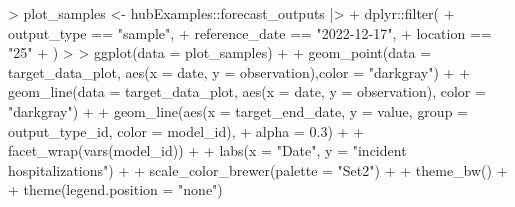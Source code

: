 \documentclass[
]{article}
\newenvironment{Shaded}{\begin{snugshade}}{\end{snugshade}}
\newcommand{\AttributeTok}[1]{\textcolor[rgb]{0.40,0.45,0.13}{#1}}
\newcommand{\ErrorTok}[1]{\textcolor[rgb]{0.68,0.00,0.00}{#1}}
\newcommand{\FloatTok}[1]{\textcolor[rgb]{0.68,0.00,0.00}{#1}}
\newcommand{\FunctionTok}[1]{\textcolor[rgb]{0.28,0.35,0.67}{#1}}
\newcommand{\NormalTok}[1]{\textcolor[rgb]{0.00,0.23,0.31}{#1}}
\newcommand{\OtherTok}[1]{\textcolor[rgb]{0.00,0.23,0.31}{#1}}
\newcommand{\SpecialCharTok}[1]{\textcolor[rgb]{0.37,0.37,0.37}{#1}}
\newcommand{\StringTok}[1]{\textcolor[rgb]{0.13,0.47,0.30}{#1}}
\begin{document}
\begin{Shaded}
\begin{Highlighting}[]
\SpecialCharTok{\textgreater{}}\NormalTok{ plot\_samples }\OtherTok{\textless{}{-}}\NormalTok{ hubExamples}\SpecialCharTok{::}\NormalTok{forecast\_outputs }\SpecialCharTok{|\textgreater{}}
\SpecialCharTok{+}\NormalTok{   dplyr}\SpecialCharTok{::}\FunctionTok{filter}\NormalTok{(}
\SpecialCharTok{+}\NormalTok{     output\_type }\SpecialCharTok{==} \StringTok{"sample"}\NormalTok{, }
\SpecialCharTok{+}\NormalTok{     reference\_date }\SpecialCharTok{==} \StringTok{"2022{-}12{-}17"}\NormalTok{,}
\SpecialCharTok{+}\NormalTok{     location }\SpecialCharTok{==} \StringTok{"25"}
\SpecialCharTok{+}\NormalTok{   )}
\SpecialCharTok{\textgreater{}}   
\ErrorTok{\textgreater{}} \FunctionTok{ggplot}\NormalTok{(}\AttributeTok{data =}\NormalTok{ plot\_samples) }\SpecialCharTok{+} 
\SpecialCharTok{+}   \FunctionTok{geom\_point}\NormalTok{(}\AttributeTok{data =}\NormalTok{ target\_data\_plot, }\FunctionTok{aes}\NormalTok{(}\AttributeTok{x =}\NormalTok{ date, }\AttributeTok{y =}\NormalTok{ observation),}\AttributeTok{color =} \StringTok{"darkgray"}\NormalTok{) }\SpecialCharTok{+}
\SpecialCharTok{+}   \FunctionTok{geom\_line}\NormalTok{(}\AttributeTok{data =}\NormalTok{ target\_data\_plot, }\FunctionTok{aes}\NormalTok{(}\AttributeTok{x =}\NormalTok{ date, }\AttributeTok{y =}\NormalTok{ observation), }\AttributeTok{color =} \StringTok{"darkgray"}\NormalTok{) }\SpecialCharTok{+}
\SpecialCharTok{+}   \FunctionTok{geom\_line}\NormalTok{(}\FunctionTok{aes}\NormalTok{(}\AttributeTok{x =}\NormalTok{ target\_end\_date, }\AttributeTok{y =}\NormalTok{ value, }\AttributeTok{group =}\NormalTok{ output\_type\_id, }\AttributeTok{color =}\NormalTok{ model\_id), }
\SpecialCharTok{+}             \AttributeTok{alpha =} \FloatTok{0.3}\NormalTok{) }\SpecialCharTok{+} 
\SpecialCharTok{+}   \FunctionTok{facet\_wrap}\NormalTok{(}\FunctionTok{vars}\NormalTok{(model\_id)) }\SpecialCharTok{+} 
\SpecialCharTok{+}   \FunctionTok{labs}\NormalTok{(}\AttributeTok{x =} \StringTok{"Date"}\NormalTok{, }\AttributeTok{y =} \StringTok{"incident hospitalizations"}\NormalTok{) }\SpecialCharTok{+}
\SpecialCharTok{+}   \FunctionTok{scale\_color\_brewer}\NormalTok{(}\AttributeTok{palette =} \StringTok{"Set2"}\NormalTok{) }\SpecialCharTok{+}
\SpecialCharTok{+}   \FunctionTok{theme\_bw}\NormalTok{() }\SpecialCharTok{+} 
\SpecialCharTok{+}   \FunctionTok{theme}\NormalTok{(}\AttributeTok{legend.position =} \StringTok{"none"}\NormalTok{)}
\end{Highlighting}
\end{Shaded}
\end{document}
